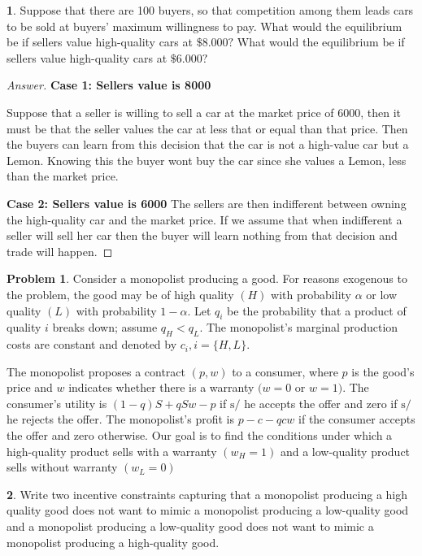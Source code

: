 \documentclass[12pt]{article}
\theoremstyle{definition}
\newtheorem{problem}{Problem}
\newtheorem{subproblem}{}[problem]
\begin{document}
\begin{subproblem}
 Suppose that there are 100 buyers, so that competition among them leads cars to be sold at buyers' maximum willingness to pay. What would the equilibrium be if sellers value high-quality cars at $\$ 8.000 ?$ What would the equilibrium be if sellers value high-quality cars at $\$ 6.000 ?$
\end{subproblem}

\begin{proof}[Answer]
\textbf{Case 1: Sellers value is 8000}

Suppose that a seller is willing to sell a car at the market price of $6000$, then it must be that the seller values the car at less that or equal than that price. Then the buyers can learn from this decision that the car is not a high-value car but a Lemon. Knowing this the buyer wont buy the car since she values a Lemon, less than the market price.

\textbf{Case 2: Sellers value is 6000} The sellers are then indifferent between owning the high-quality car and the market price. If we assume that when indifferent a seller will sell her car then the buyer will learn nothing from that decision and trade will happen.

\end{proof}

\begin{problem}
Consider a monopolist producing a good. For reasons exogenous to the problem, the good may be of high quality $(H)$ with probability $\alpha$ or low quality $(L)$ with probability $1-\alpha$. Let $q_{i}$ be the probability that a product of quality $i$ breaks down; assume $q_{H}<q_{L}$. The monopolist's marginal production costs are constant and denoted by $c_{i}, i=\{H, L\}$.

The monopolist proposes a contract $(p, w)$ to a consumer, where $p$ is the good's price and $w$ indicates whether there is a warranty $(w=0$ or $w=1)$. The consumer's utility is $(1-q) S+q S w-p$ if $\mathrm{s} /$ he accepts the offer and zero if $\mathrm{s} /$ he rejects the offer. The monopolist's profit is $p-c-q c w$ if the consumer accepts the offer and zero otherwise. Our goal is to find the conditions under which a high-quality product sells with a warranty $\left(w_{H}=1\right)$ and a low-quality product sells without warranty $\left(w_{L}=0\right)$
\end{problem}
\begin{subproblem}
Write two incentive constraints capturing that a monopolist producing a high quality good does not want to mimic a monopolist producing a low-quality good and a monopolist producing a low-quality good does not want to mimic a monopolist producing a high-quality good.

\end{subproblem}
\end{document}
